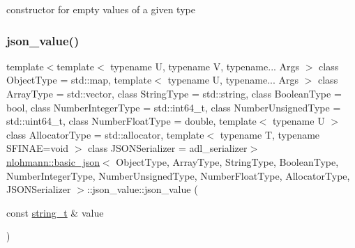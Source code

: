 constructor for empty values of a given type 

\mbox{\label{unionnlohmann_1_1basic__json_1_1json__value_a8f75abc358ee45b9bbdc601c974d6c91}} 
\subsubsection{\texorpdfstring{json\_value()}{json\_value()}\hspace{0.1cm}{\footnotesize\ttfamily [7/12]}}
{\footnotesize\ttfamily template$<$template$<$ typename U, typename V, typename... Args $>$ class Object\+Type = std\+::map, template$<$ typename U, typename... Args $>$ class Array\+Type = std\+::vector, class String\+Type  = std\+::string, class Boolean\+Type  = bool, class Number\+Integer\+Type  = std\+::int64\+\_\+t, class Number\+Unsigned\+Type  = std\+::uint64\+\_\+t, class Number\+Float\+Type  = double, template$<$ typename U $>$ class Allocator\+Type = std\+::allocator, template$<$ typename T, typename S\+F\+I\+N\+A\+E=void $>$ class J\+S\+O\+N\+Serializer = adl\+\_\+serializer$>$ \\
\mbox{\hyperlink{classnlohmann_1_1basic__json}{nlohmann\+::basic\+\_\+json}}$<$ Object\+Type, Array\+Type, String\+Type, Boolean\+Type, Number\+Integer\+Type, Number\+Unsigned\+Type, Number\+Float\+Type, Allocator\+Type, J\+S\+O\+N\+Serializer $>$\+::json\+\_\+value\+::json\+\_\+value (\begin{DoxyParamCaption}\item[{const \mbox{\hyperlink{classnlohmann_1_1basic__json_a61f8566a1a85a424c7266fb531dca005}{string\+\_\+t}} \&}]{value }\end{DoxyParamCaption})\hspace{0.3cm}{\ttfamily [inline]}}



